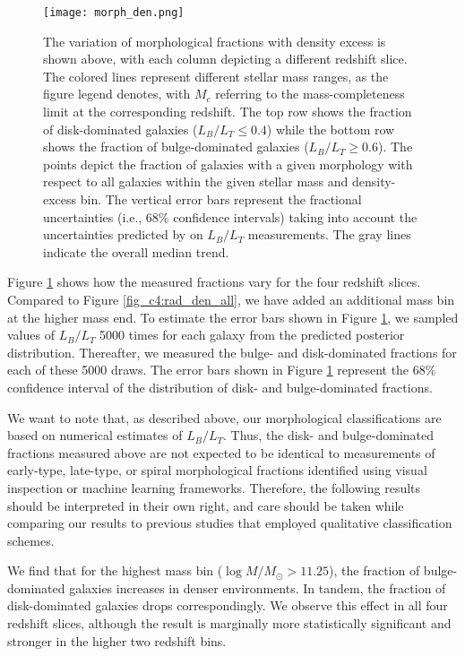 \begin{figure}[htb]
    \centering
    \texttt{[image: morph\_den.png]}
    \caption{The variation of morphological fractions with density excess is shown above, with each column depicting a different redshift slice. The colored lines represent different stellar mass ranges, as the figure legend denotes, with $M_c$ referring to the mass-completeness limit at the corresponding redshift. The top row shows the fraction of disk-dominated galaxies ($L_B/L_T \leq 0.4$) while the bottom row shows the fraction of bulge-dominated galaxies ($L_B/L_T \geq 0.6$). The points depict the fraction of galaxies with a given morphology with respect to all galaxies within the given stellar mass and density-excess bin. The vertical error bars represent the fractional uncertainties (i.e., $68\%$ confidence intervals) taking into account the uncertainties predicted by \gampen{} on $L_B/L_T$ measurements. The gray lines indicate the overall median trend.}
    \label{fig_c4:morph_den}
\end{figure}

Figure \ref{fig_c4:morph_den} shows how the measured fractions vary for the four redshift slices. Compared to Figure \ref{fig_c4:rad_den_all}, we have added an additional mass bin at the higher mass end. To estimate the error bars shown in Figure \ref{fig_c4:morph_den}, we sampled values of $L_B/L_T$ 5000 times for each galaxy from the predicted posterior distribution. Thereafter, we measured the bulge- and disk-dominated fractions for each of these 5000 draws. The error bars shown in Figure \ref{fig_c4:morph_den} represent the $68\%$ confidence interval of the distribution of disk- and bulge-dominated fractions.

We want to note that, as described above, our morphological classifications are based on numerical estimates of $L_B/L_T$. Thus, the disk- and bulge-dominated fractions measured above are not expected to be identical to measurements of early-type, late-type, or spiral morphological fractions identified using visual inspection or machine learning frameworks. Therefore, the following results should be interpreted in their own right, and care should be taken while comparing our results to previous studies that employed qualitative classification schemes. 

We find that for the highest mass bin ($\log M/M_{\odot} > 11.25$), the fraction of bulge-dominated galaxies increases in denser environments. In tandem, the fraction of disk-dominated galaxies drops correspondingly. We observe this effect in all four redshift slices, although the result is marginally more statistically significant and stronger in the higher two redshift bins.

